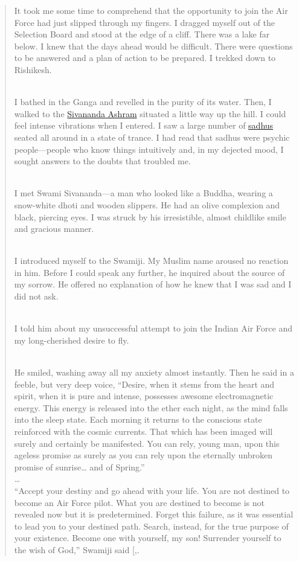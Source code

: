 \documentclass[
  a4paper,
]{article}
\begin{document}
\begin{quote}
It took me some time to comprehend that the opportunity to join the Air
Force had just slipped through my fingers. I dragged myself out of the
Selection Board and stood at the edge of a cliff. There was a lake far
below. I knew that the days ahead would be difficult. There were
questions to be answered and a plan of action to be prepared. I trekked
down to Rishikesh.\\
\strut \\
I bathed in the Ganga and revelled in the purity of its water. Then, I
walked to the
\href{https://en.wikipedia.org/wiki/Divine_Life_Society}{Sivananda
Ashram} situated a little way up the hill. I could feel intense
vibrations when I entered. I saw a large number of
\href{https://en.wikipedia.org/wiki/Sadhu}{sadhus} seated all around in
a state of trance. I had read that sadhus were psychic people---people
who know things intuitively and, in my dejected mood, I sought answers
to the doubts that troubled me.\\
\strut \\
I met Swami Sivananda---a man who looked like a Buddha, wearing a
snow-white dhoti and wooden slippers. He had an olive complexion and
black, piercing eyes. I was struck by his irresistible, almost childlike
smile and gracious manner.\\
\strut \\
I introduced myself to the Swamiji. My Muslim name aroused no reaction
in him. Before I could speak any further, he inquired about the source
of my sorrow. He offered no explanation of how he knew that I was sad
and I did not ask.\\
\strut \\
I told him about my unsuccessful attempt to join the Indian Air Force
and my long-cherished desire to fly.\\
\strut \\
He smiled, washing away all my anxiety almost instantly. Then he said in
a feeble, but very deep voice, ``Desire, when it stems from the heart
and spirit, when it is pure and intense, possesses awesome
electromagnetic energy. This energy is released into the ether each
night, as the mind falls into the sleep state. Each morning it returns
to the conscious state reinforced with the cosmic currents. That which
has been imaged will surely and certainly be manifested. You can rely,
young man, upon this ageless promise as surely as you can rely upon the
eternally unbroken promise of sunrise\ldots{} and of Spring.''\\
\ldots{}\\
``Accept your destiny and go ahead with your life. You are not destined
to become an Air Force pilot. What you are destined to become is not
revealed now but it is predetermined. Forget this failure, as it was
essential to lead you to your destined path. Search, instead, for the
true purpose of your existence. Become one with yourself, my son!
Surrender yourself to the wish of God,'' Swamiji said
{[},\citeproc{ref-kalam-wof-online}{2}{]}.
\end{quote}
\end{document}
